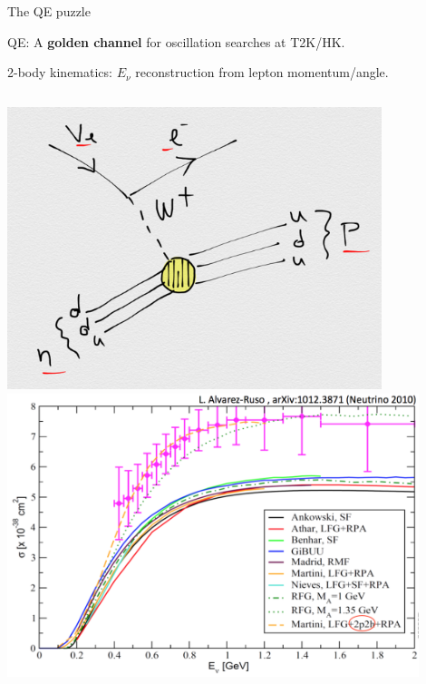 %
%
%
\begin{frame}{The QE puzzle}

\begin{itemize}
  {\small
  \item QE: A {\bf golden channel} for oscillation searches at T2K/HK.\\
  \item 2-body kinematics: $E_{\nu}$ reconstruction from lepton momentum/angle.\\
  }
\end{itemize}

  \begin{columns}
    \begin{column}{0.42\textwidth}
      \begin{center}
         \includegraphics[width=0.82\textwidth]{./images/nuint/feyn/ccqe_feynman_diagram_0}\\
         \vspace{0.2cm}
         \includegraphics[width=0.90\textwidth]{./images/nuint/ccqe/qe_puzzle}\\

\end{center}
\end{column}
\end{columns}
\end{frame}
